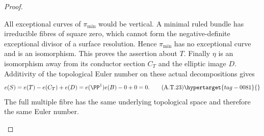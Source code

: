 \begin{proof}
\begin{enumerate}[label={$\langle1\rangle$\arabic*.},leftmargin=*]
All exceptional curves of $\pi_{\min}$ would be
vertical. A minimal ruled bundle has irreducible
fibres of square zero, which cannot form the
negative-definite exceptional divisor of a surface
resolution. Hence $\pi_{\min}$ has no exceptional
curve and is an isomorphism. This proves the assertion
about $T$. Finally $\eta$ is an isomorphism away from
its conductor section $C_T$ and the elliptic image
$D$. Additivity of the topological Euler number on
these actual decompositions gives
\[
 e(S)=e(T)-e(C_T)+e(D)
      =e(\PP^1)e(B)-0+0=0.                       \tag{A.T.23}\hypertarget{tag-0081}{}\label{cdp:eq:A.T.23}
\]
The full multiple fibre has the same underlying
topological space and therefore the same Euler number.

\end{enumerate}
\end{proof}
